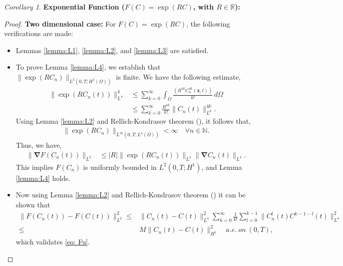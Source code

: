 \documentclass[final,3p,times]{elsarticle}
\theoremstyle{plain}
\theoremstyle{remark}
\newtheorem{corollary}{Corollary}
\theoremstyle{plain}
\theoremstyle{remark}
\begin{document}
    \begin{corollary}
    \textbf{Exponential Function (\( F\left(C\right) = \exp\left(RC\right) \), with \( R \in \mathds{R} \)):} 
    \end{corollary}
    \begin{proof} 

\textbf{Two dimensional case:}
    For \( F\left(C\right) = \exp\left(RC\right) \), the following verifications are made:
    \begin{itemize}
        \item Lemmas \ref{lemma:L1}, \ref{lemma:L2}, and \ref{lemma:L3} are satisfied.
        
        \item To prove Lemma \ref{lemma:L4}, we establish that \( \|\exp\left(RC_n\right)\|_{L^2\left(0,T;H^1\left(\Omega\right)\right)} \) is finite. We have the following estimate,
        \begin{align}
        \|\exp\left(RC_n\left(t\right)\right)\|_{L^4}^4 &\leq \sum_{k=0}^\infty \int_\Omega \frac{\left(R^{4k} C_n^{4k}\left(\mathbf{x},t\right)\right)}{k!} \, d\Omega \nonumber \\
        &\leq \sum_{k=0}^\infty \frac{R^{4k}}{k!} \|C_n\left(t\right)\|_{L^k}^{4k}.
        \end{align}
        Using Lemma \ref{lemma:L2} and Rellich-Kondrasov theorem (\emph{\citep[Theorem 2.6.3]{kesavan2015topics}}), it follows that,
        \begin{align}
        \|\exp\left(RC_n\right)\|_{L^\infty\left(0,T;L^4\left(\Omega\right)\right)} < \infty \quad \forall n \in \mathds{N}.
        \end{align}
        Thus, we have,
        \begin{align}
            \|\boldsymbol{\nabla} F\left(C_n\left(t\right)\right)\|_{L^2} &\leq |R| \|\exp\left(RC_n\left(t\right)\right)\|_{L^4} \|\boldsymbol{\nabla} C_n\left(t\right)\|_{L^4}.
        \end{align}
        This implies \( F\left(C_n\right) \) is uniformly bounded in \( L^2\left(0,T;H^1\right) \), and Lemma \ref{lemma:L4} holds.

       \item Now using Lemma \ref{lemma:L2} and Rellich-Kondrasov theorem (\emph{\citep[Theorem 2.6.3]{kesavan2015topics}}) it can be shown that
       \begin{align}
 \|F\left(C_n\left(t\right)\right)-F\left(C\left(t\right)\right)\|^2_{L^2}\le& \|C_n\left(t\right)-C\left(t\right)\|^2_{L^4}  \sum_{k=0}^\infty \frac{1}{k!} \sum_{l=0}^{k-1} \|C_n^l\left(t\right)C^{k-1-l}\left(t\right)\|^2_{L^4} \nonumber\\
 \le& M \|C_n\left(t\right)-C\left(t\right)\|^2_{H^1} \quad a.e.\  on \ \left(0,T\right) \label{eq: exp limit pass},
 \end{align}
        which validates \eqref{eq: Fu}.
        

\end{itemize}
\end{proof}
\end{document}
